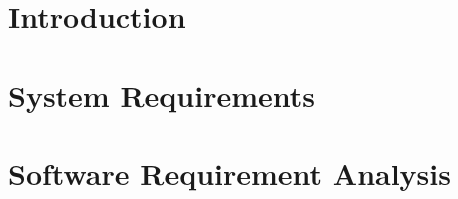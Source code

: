 \documentclass[12pt]{report}
\begin{document}

\begin{screen}
\ppttitle
\end{screen}
\footskip 0.7cm
\thispagestyle{empty} 
\pagetitle
\newpage
{}
\cfoot{\thepage}

%

%

\newpage
\tableofcontents
\newpage

\cfoot{\thepage}
\newpage
\chapter{Introduction}

\newpage
\chapter{System Requirements}

\chapter{Software Requirement Analysis}

%
%
%
%
%
\end{document}
